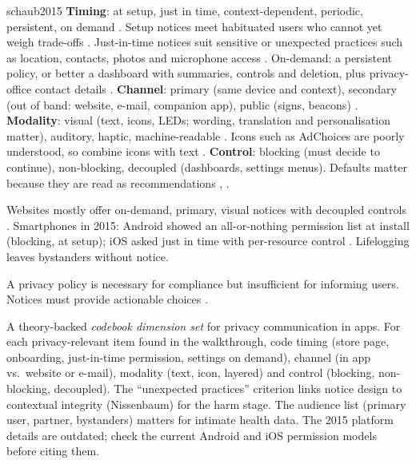 \begin{papercard}{schaub2015}
 \textbf{Timing}: at setup, just in time, context-dependent, periodic, persistent, on demand . Setup notices meet habituated users who cannot yet weigh trade-offs . Just-in-time notices suit sensitive or unexpected practices such as location, contacts, photos and microphone access . On-demand: a persistent policy, or better a dashboard with summaries, controls and deletion, plus privacy-office contact details . \textbf{Channel}: primary (same device and context), secondary (out of band: website, e-mail, companion app), public (signs, beacons) . \textbf{Modality}: visual (text, icons, LEDs; wording, translation and personalisation matter), auditory, haptic, machine-readable . Icons such as AdChoices are poorly understood, so combine icons with text . \textbf{Control}: blocking (must decide to continue), non-blocking, decoupled (dashboards, settings menus). Defaults matter because they are read as recommendations , .

 Websites mostly offer on-demand, primary, visual notices with decoupled controls . Smartphones in 2015: Android showed an all-or-nothing permission list at install (blocking, at setup); iOS asked just in time with per-resource control . Lifelogging leaves bystanders without notice.

 A privacy policy is necessary for compliance but insufficient for informing users. Notices must provide actionable choices .

 A theory-backed \emph{codebook dimension set} for privacy communication in apps. For each privacy-relevant item found in the walkthrough, code timing (store page, onboarding, just-in-time permission, settings on demand), channel (in app vs.\ website or e-mail), modality (text, icon, layered) and control (blocking, non-blocking, decoupled). The ``unexpected practices'' criterion links notice design to contextual integrity (Nissenbaum) for the harm stage. The audience list (primary user, partner, bystanders) matters for intimate health data. The 2015 platform details are outdated; check the current Android and iOS permission models before citing them.
\end{papercard}
